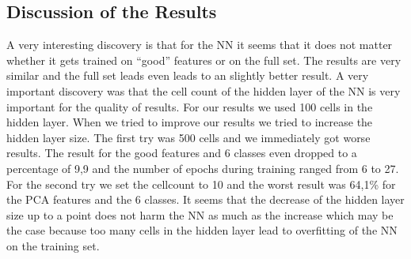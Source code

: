 \documentclass[subfigure,epsfig,fleqn,float,ausarbeitung]{scrartcl}
\begin{document}
\subsection{Discussion of the Results}

A very interesting discovery is that for the NN it seems that it does not matter whether it gets trained on “good” features or on the full set. The results are very similar and the full set leads even leads to an slightly better result. A very important discovery was that the cell count of the hidden layer of the NN is very important for the quality of results. For our results we used 100 cells in the hidden layer. When we tried to improve our results we tried to increase the hidden layer size. 
The first try was 500 cells and we immediately got worse results. The result for the good features and 6 classes even dropped to a percentage of 9,9 and the number of epochs during training ranged from 6 to 27.
For the second try we set the cellcount to 10 and the worst result was 64,1\% for the PCA features and the 6 classes. It seems that the decrease of the hidden layer size up to a point does not harm the NN as much as the increase which may be the case because too many cells in the hidden layer lead to overfitting of the NN on the training set. 
\end{document}
